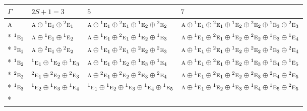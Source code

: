\documentclass[10pt,a4paper]{article}
\numberwithin{equation}{section}
\newcommand{\irr}[1]{\text{\normalfont\scshape #1}}
\newcommand{\conjpair}[1]{{}^{#1}}
\begin{document}
{\small\setlength{\tabcolsep}{3pt}\begin{longtable}{@{}llll@{}}\toprule
$\Gamma$ & $2S + 1 = 3$ & $5$ & $7$\\\midrule\endhead
\bottomrule\endfoot\endlastfoot
$\irr{a}$ & $\irr{a}\oplus \conjpair{1}\irr{e}_{1}\oplus \conjpair{2}\irr{e}_{1}$ & $\irr{a}\oplus \conjpair{1}\irr{e}_{1}\oplus \conjpair{2}\irr{e}_{1}\oplus \conjpair{1}\irr{e}_{2}\oplus \conjpair{2}\irr{e}_{2}$ & $\irr{a}\oplus \conjpair{1}\irr{e}_{1}\oplus \conjpair{2}\irr{e}_{1}\oplus \conjpair{1}\irr{e}_{2}\oplus \conjpair{2}\irr{e}_{2}\oplus \conjpair{1}\irr{e}_{3}\oplus \conjpair{2}\irr{e}_{3}$\\*
$\conjpair{1}\irr{e}_{1}$ & $\irr{a}\oplus \conjpair{1}\irr{e}_{1}\oplus \conjpair{1}\irr{e}_{2}$ & $\irr{a}\oplus \conjpair{1}\irr{e}_{1}\oplus \conjpair{2}\irr{e}_{1}\oplus \conjpair{1}\irr{e}_{2}\oplus \conjpair{1}\irr{e}_{3}$ & $\irr{a}\oplus \conjpair{1}\irr{e}_{1}\oplus \conjpair{2}\irr{e}_{1}\oplus \conjpair{1}\irr{e}_{2}\oplus \conjpair{2}\irr{e}_{2}\oplus \conjpair{1}\irr{e}_{3}\oplus \conjpair{1}\irr{e}_{4}$\\*
$\conjpair{2}\irr{e}_{1}$ & $\irr{a}\oplus \conjpair{2}\irr{e}_{1}\oplus \conjpair{2}\irr{e}_{2}$ & $\irr{a}\oplus \conjpair{1}\irr{e}_{1}\oplus \conjpair{2}\irr{e}_{1}\oplus \conjpair{2}\irr{e}_{2}\oplus \conjpair{2}\irr{e}_{3}$ & $\irr{a}\oplus \conjpair{1}\irr{e}_{1}\oplus \conjpair{2}\irr{e}_{1}\oplus \conjpair{1}\irr{e}_{2}\oplus \conjpair{2}\irr{e}_{2}\oplus \conjpair{2}\irr{e}_{3}\oplus \conjpair{2}\irr{e}_{4}$\\*
$\conjpair{1}\irr{e}_{2}$ & $\conjpair{1}\irr{e}_{1}\oplus \conjpair{1}\irr{e}_{2}\oplus \conjpair{1}\irr{e}_{3}$ & $\irr{a}\oplus \conjpair{1}\irr{e}_{1}\oplus \conjpair{1}\irr{e}_{2}\oplus \conjpair{1}\irr{e}_{3}\oplus \conjpair{1}\irr{e}_{4}$ & $\irr{a}\oplus \conjpair{1}\irr{e}_{1}\oplus \conjpair{2}\irr{e}_{1}\oplus \conjpair{1}\irr{e}_{2}\oplus \conjpair{1}\irr{e}_{3}\oplus \conjpair{1}\irr{e}_{4}\oplus \conjpair{1}\irr{e}_{5}$\\*
$\conjpair{2}\irr{e}_{2}$ & $\conjpair{2}\irr{e}_{1}\oplus \conjpair{2}\irr{e}_{2}\oplus \conjpair{2}\irr{e}_{3}$ & $\irr{a}\oplus \conjpair{2}\irr{e}_{1}\oplus \conjpair{2}\irr{e}_{2}\oplus \conjpair{2}\irr{e}_{3}\oplus \conjpair{2}\irr{e}_{4}$ & $\irr{a}\oplus \conjpair{1}\irr{e}_{1}\oplus \conjpair{2}\irr{e}_{1}\oplus \conjpair{2}\irr{e}_{2}\oplus \conjpair{2}\irr{e}_{3}\oplus \conjpair{2}\irr{e}_{4}\oplus \conjpair{2}\irr{e}_{5}$\\*
$\conjpair{1}\irr{e}_{3}$ & $\conjpair{1}\irr{e}_{2}\oplus \conjpair{1}\irr{e}_{3}\oplus \conjpair{1}\irr{e}_{4}$ & $\conjpair{1}\irr{e}_{1}\oplus \conjpair{1}\irr{e}_{2}\oplus \conjpair{1}\irr{e}_{3}\oplus \conjpair{1}\irr{e}_{4}\oplus \conjpair{1}\irr{e}_{5}$ & $\irr{a}\oplus \conjpair{1}\irr{e}_{1}\oplus \conjpair{1}\irr{e}_{2}\oplus \conjpair{1}\irr{e}_{3}\oplus \conjpair{1}\irr{e}_{4}\oplus \conjpair{1}\irr{e}_{5}\oplus \conjpair{2}\irr{e}_{5}$\\*

\end{longtable}}
\end{document}
